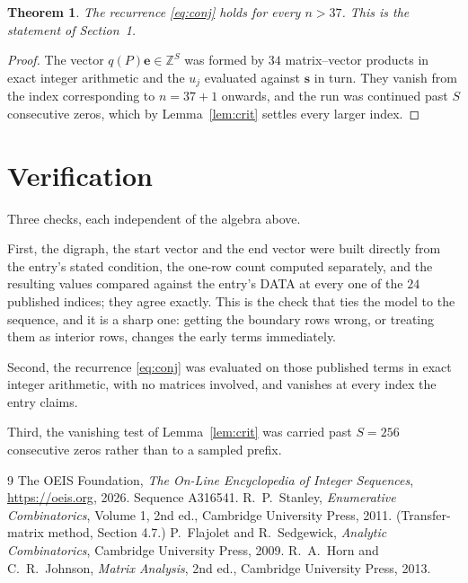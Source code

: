 \documentclass[11pt,a4paper]{article}
\theoremstyle{plain}
\newtheorem{theorem}{Theorem}
\theoremstyle{definition}
\begin{document}
\begin{theorem}
The recurrence \eqref{eq:conj} holds for every $n>37$. This is the statement of
Section~1.
\end{theorem}

\begin{proof}
The vector $q(P)\mathbf{e}\in\mathbb{Z}^{S}$ was formed by $34$ matrix--vector
products in exact integer arithmetic and the $u_j$ evaluated against $\mathbf{s}$ in turn.
They vanish from the index corresponding to $n=37+1$ onwards, and the run was continued
past $S$ consecutive zeros, which by Lemma~\ref{lem:crit} settles every larger index.
\end{proof}

\section{Verification}

Three checks, each independent of the algebra above.

First, the digraph, the start vector and the end vector were built directly from the
entry's stated condition, the one-row count computed separately, and the resulting values
compared against the entry's DATA at every one of the $24$ published indices; they
agree exactly. This is the check that ties the model to the sequence, and it is a sharp one:
getting the boundary rows wrong, or treating them as interior rows, changes the early terms
immediately.

Second, the recurrence \eqref{eq:conj} was evaluated on those published terms in exact
integer arithmetic, with no matrices involved, and vanishes at every index the entry claims.

Third, the vanishing test of Lemma~\ref{lem:crit} was carried past $S=256$ consecutive
zeros rather than to a sampled prefix.

\begin{thebibliography}{9}
 The OEIS Foundation, \emph{The On-Line Encyclopedia of Integer
Sequences}, \url{https://oeis.org}, 2026. Sequence A316541.
 R.~P.~Stanley, \emph{Enumerative Combinatorics}, Volume 1, 2nd ed.,
Cambridge University Press, 2011. (Transfer-matrix method, Section 4.7.)
 P.~Flajolet and R.~Sedgewick, \emph{Analytic Combinatorics}, Cambridge
University Press, 2009.
 R.~A.~Horn and C.~R.~Johnson, \emph{Matrix Analysis}, 2nd ed., Cambridge
University Press, 2013.
\end{thebibliography}
\end{document}
